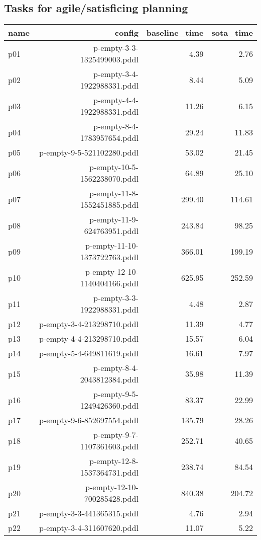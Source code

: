 \documentclass{article}
\begin{document}
                    \subsection*{Tasks for agile/satisficing planning}
                    
                            \begin{center}
                            \scriptsize
                            \begin{tabular}{@{}l|r|r|r@{}}
                            name & config & baseline\_time & sota\_time\\\midrule
                              p01& p-empty-3-3-1325499003.pddl&4.39&2.76\\
  p02& p-empty-3-4-1922988331.pddl&8.44&5.09\\
  p03& p-empty-4-4-1922988331.pddl&11.26&6.15\\
  p04& p-empty-8-4-1783957654.pddl&29.24&11.83\\
  p05& p-empty-9-5-521102280.pddl&53.02&21.45\\
  p06& p-empty-10-5-1562238070.pddl&64.89&25.10\\
  p07& p-empty-11-8-1552451885.pddl&299.40&114.61\\
  p08& p-empty-11-9-624763951.pddl&243.84&98.25\\
  p09& p-empty-11-10-1373722763.pddl&366.01&199.19\\
  p10& p-empty-12-10-1140404166.pddl&625.95&252.59\\
  p11& p-empty-3-3-1922988331.pddl&4.48&2.87\\
  p12& p-empty-3-4-213298710.pddl&11.39&4.77\\
  p13& p-empty-4-4-213298710.pddl&15.57&6.04\\
  p14& p-empty-5-4-649811619.pddl&16.61&7.97\\
  p15& p-empty-8-4-2043812384.pddl&35.98&11.39\\
  p16& p-empty-9-5-1249426360.pddl&83.37&22.99\\
  p17& p-empty-9-6-852697554.pddl&135.79&28.26\\
  p18& p-empty-9-7-1107361603.pddl&252.71&40.65\\
  p19& p-empty-12-8-1537364731.pddl&238.74&84.54\\
  p20& p-empty-12-10-700285428.pddl&840.38&204.72\\
  p21& p-empty-3-3-441365315.pddl&4.76&2.94\\
  p22& p-empty-3-4-311607620.pddl&11.07&5.22\\

\end{tabular}
\end{center}
\end{document}
